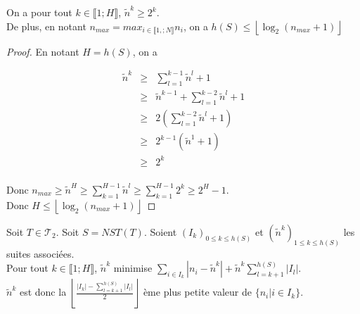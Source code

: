 \begin{cor}
  \label{cor2}
  On a pour tout $k
  \in \llbracket 1;H \rrbracket$, $\tilde{n}^{k} \geqslant
  2^{k}$. \\
  De plus, en notant $n_{max}
  = max_{i \in \llbracket 1,;N \rrbracket} n_{i}$, on a $h(S)
  \leqslant \left\lfloor \log_{2}(n_{max}+1) \right\rfloor$
  \begin{proof}
    En notant $H = h(S)$, on a 
    \begin{center}
      $$
      \begin{array}{rcl}
        \tilde{n}^{k} &\geqslant& \sum_{l=1}^{k-1} \tilde{n}^{l} + 1\\
                      &\geqslant& \tilde{n}^{k-1} + \sum_{l=1}^{k-2}
                                  \tilde{n}^{l} + 1 \\
                      &\geqslant& 2(\sum_{l=1}^{k-2} \tilde{n}^{l} + 1) \\
                      &\geqslant& 2^{k-1}(\tilde{n}^{1} +1)\\
                      &\geqslant& 2^{k}\\
      \end{array}
      $$
    \end{center}
    Donc $n_{max} \geqslant \tilde{n}^{H}
    \geqslant \sum_{k=1}^{H-1} \tilde{n}^{l} \geqslant \sum_{k=1}^{H-1} 2^{k}
    \geqslant 2^{H} -1$. \\
    Donc $H \leqslant \left\lfloor \log_{2}(n_{max}+1) \right\rfloor$
      \end{proof}
\end{cor}

\begin{lem}
  \label{lem10}
  Soit $T \in \mathcal{T}_{2}$. Soit $S = NST(T)$.  Soient
  $(I_{k})_{0 \leqslant k \leqslant h(S)}$ et
  $(\tilde{n}^{k})_{1 \leqslant k \leqslant h(S)}$ les suites
  associées.\\
  Pour tout $k \in \llbracket 1;H \rrbracket$, $\tilde{n}^{k}$
  minimise
  $\sum_{i \in I_{k}} |n_{i} - \tilde{n}^{k}| +
  \tilde{n}^{k}\sum_{l=k+1}^{h(S)}|I_{l}|$.\\ 
  $\tilde{n}^{k}$ est donc la $\left\lfloor \frac{|I_{k}|
      - \sum_{l=k+1}^{h(S)}|I_{l}|}{2} \right\rfloor$ ème plus petite
  valeur de $\{n_{i} | i \in I_{k} \}$.
\end{lem}

